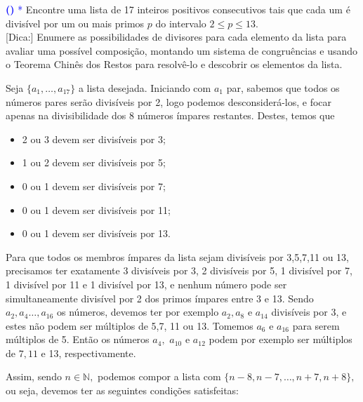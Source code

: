 \documentclass[12pt, a4paper]{article}
\newcounter{exercicio}[section]
\newenvironment{exercicio}[1][]{\refstepcounter{exercicio}\par\medskip
 \textcolor{blue}{\bf(\theexercicio)} \rmfamily}{\medskip }
\begin{document}
\begin{exercicio}\textcolor{Blue}{*}
Encontre uma lista de 17 inteiros positivos consecutivos tais que cada um é divisível por um ou mais primos $p$ do intervalo $ 2 \le p \le 13.$\\
\textsf{[Dica:]} Enumere as possibilidades de divisores para cada elemento da lista para avaliar uma possível composição, montando um sistema de congruências e usando o Teorema Chinês dos Restos para resolvê-lo e descobrir os elementos da lista.
\end{exercicio}
\begin{solution}
Seja $\{a_1, \ldots, a_{17} \}$ a lista desejada. Iniciando com $a_1$ par, sabemos que todos os números pares serão divisíveis por 2, logo podemos desconsiderá-los, e focar apenas na divisibilidade dos 8 números ímpares restantes. Destes, temos que
\begin{itemize}
    \item 2 ou 3 devem ser divisíveis por 3;
    \item 1 ou 2 devem ser divisíveis por 5;
    \item 0 ou 1 devem ser divisíveis por 7;
    \item 0 ou 1 devem ser divisíveis por 11;
    \item 0 ou 1 devem ser divisíveis por 13.
\end{itemize}
Para que todos os membros ímpares da lista sejam divisíveis por 3,5,7,11 ou 13, precisamos ter exatamente 3 divisíveis por 3, 2 divisíveis por 5, 1 divisível por 7, 1 divisível por 11 e 1 divisível por 13, e nenhum número pode ser simultaneamente divisível por 2 dos primos ímpares entre 3 e 13. Sendo $a_2, a_4 \ldots, a_{16}$ os números, devemos ter por exemplo $a_2, a_8$ e $a_{14}$ divisíveis por 3, e estes não podem ser múltiplos de 5,7, 11 ou 13. Tomemos $a_6$ e $a_{16}$ para serem múltiplos de 5. Então os números $a_4,$ $a_{10}$ e $a_{12}$ podem por exemplo ser múltiplos de $7, 11$ e 13, respectivamente. 

Assim, sendo $n \in \mathbb{N},$ podemos compor a lista com $\{n-8, n-7, \ldots, n+7, n+8\},$ ou seja, devemos ter as seguintes condições satisfeitas:


\end{solution}
\end{document}
